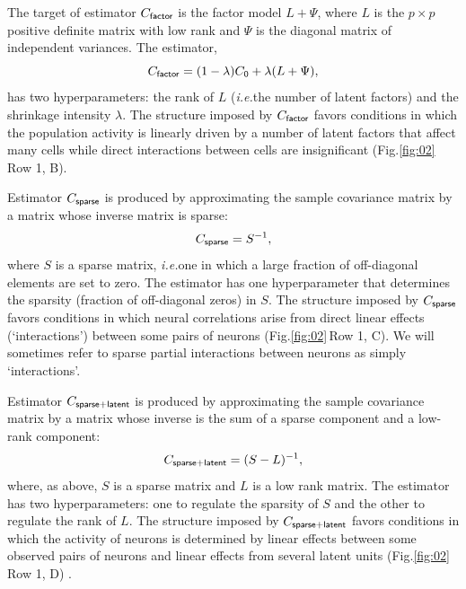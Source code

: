 \documentclass[10pt]{article}
\newcommand{\sq}[1]{\lq#1\rq}
\newcommand{\figref}[2]{Fig.\;\ref{fig:#1}\,#2}
\newcommand{\ie}{\emph{i.e.}\;}
\begin{document}
The target of estimator $C_{\sf factor}$ is the factor model $L + \Psi$, where $L$ is the $p\times p$ positive definite matrix with low rank and $\Psi$ is the diagonal matrix of independent variances.  The estimator, 
\begin{equation}\label{eq:c-factor}
C_{\sf factor} = (1-\lambda) C_{\sf 0} + \lambda (L + \Psi),
\end{equation}
has two hyperparameters: the rank of $L$ (\ie the number of latent factors) and the shrinkage intensity $\lambda$. The structure imposed by $C_{\sf factor}$ favors conditions in which the population activity is linearly driven by a number of latent factors that affect many cells while direct interactions between cells are insignificant (\figref{02}{Row 1, B}).   

Estimator $C_{\sf sparse}$ is produced by approximating the sample covariance matrix by a matrix whose inverse matrix is sparse: 
\begin{equation}\label{eq:c-sparse}
C_{\sf sparse} = S^{-1},
\end{equation}
where $S$ is a sparse matrix, \ie one in which a large fraction of off-diagonal elements are set to zero.  The estimator has one hyperparameter that determines the sparsity (fraction of off-diagonal zeros) in $S$.  The structure imposed by $C_{\sf sparse}$ favors conditions in which neural correlations arise from direct linear effects (\sq{interactions}) between some pairs of neurons (\figref{02}{Row 1, C}).  We will sometimes refer to sparse partial interactions between neurons as simply \sq{interactions}.

Estimator $C_{\sf sparse+latent}$ is produced by approximating the sample covariance matrix by a matrix whose inverse is the sum of a sparse component and a low-rank component: 
\begin{equation}\label{eq:c-sl}
C_{\sf sparse+latent} = (S - L)^{-1},
\end{equation}
where, as above, $S$ is a sparse matrix and $L$ is a low rank matrix. The estimator has two hyperparameters: one to regulate the sparsity of $S$ and the other to regulate the rank of $L$. The structure imposed by $C_{\sf sparse+latent}$ favors conditions in which the activity of neurons is determined by linear effects between some observed pairs of neurons and linear effects from several latent units (\figref{02}{Row 1, D}) \cite{Chandrasekaran:2010,Ma:2013}.
\end{document}
